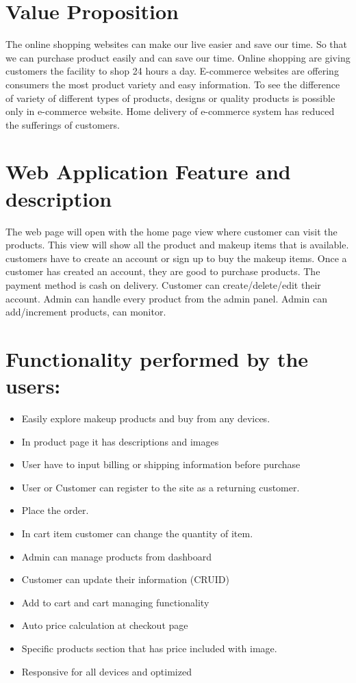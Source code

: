 \documentclass[12pt,letterpaper]{article}
\begin{document}
\hfill \break

\section{Value Proposition}
The online shopping websites can make our live easier and save our time. So that we can purchase product easily and can save our time. Online shopping are giving customers the facility to shop 24 hours a day. E-commerce websites are offering consumers the most product variety and easy information. To see the difference of variety of different types of products, designs or quality products is possible only in e-commerce website. Home delivery of e-commerce system has reduced the sufferings of customers.

\hfill \break

\section{Web Application Feature and description}
The web page will open with the home page view where customer can visit the products. This view will show all the product and makeup items that is available. customers have to create an account or sign up to buy the makeup items. Once a customer has created an account, they are good to purchase products. The payment method is cash on delivery. Customer can create/delete/edit their account. Admin can handle every product from the admin panel. Admin can add/increment products, can monitor. \\

\hfill \break

\section{Functionality performed by the users:}
\begin{itemize}
    \item 	Easily explore makeup products and buy from any devices.
    \item	In product page it has descriptions and images
    \item	User have to input billing or shipping information before purchase
    \item	User or Customer can register to the site as a returning customer.
    \item 	Place the order.
    \item	In cart item customer can change the quantity of item.
    \item   Admin can manage products from dashboard
    \item   Customer can update their information (CRUID)
    \item	Add to cart and cart managing functionality
    \item	Auto price calculation at checkout page
    \item	Specific products section that has price included with image.
    \item	Responsive for all devices and optimized
\end{itemize}
\end{document}
